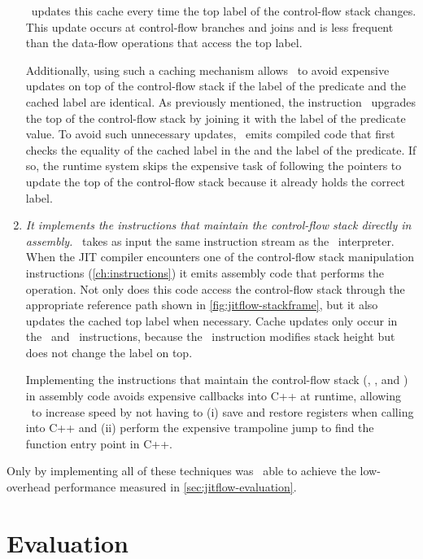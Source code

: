 \begin{enumerate}
\JitFlow\ updates this cache every time the top label of the control-flow stack changes.
This update occurs at control-flow branches and joins and is less frequent than the data-flow operations that access the top label.

Additionally, using such a caching mechanism allows \JitFlow\ to avoid expensive updates on top of the control-flow stack if the label of the predicate and the cached label are identical.
As previously mentioned, the instruction \join\ upgrades the top of the control-flow stack by joining it with the label of the predicate value.
To avoid such unnecessary updates, \JitFlow\ emits compiled code that first checks the equality of the cached label in the  and the label of the predicate.
If so, the runtime system skips the expensive task of following the pointers to update the top of the control-flow stack because it already holds the correct label.

\item \textit{It implements the instructions that maintain the control-flow stack directly in assembly.}
\JitFlow\ takes as input the same instruction stream as the \FlowCore\ interpreter.
When the JIT compiler encounters one of the control-flow stack manipulation instructions (\autoref{ch:instructions}) it emits assembly code that performs the operation.
Not only does this code access the control-flow stack through the appropriate reference path shown in \autoref{fig:jitflow-stackframe}, but it also updates the cached top label when necessary.
Cache updates only occur in the \join\ and \popj\ instructions, because the \dup\ instruction modifies stack height but does not change the label on top.

Implementing the instructions that maintain the control-flow stack (\dup, \join, and \popj) in assembly code avoids expensive callbacks into C++ at runtime, allowing \JitFlow\ to increase speed by not having to (i) save and restore registers when calling into C++ and (ii) perform the expensive trampoline jump to find the function entry point in C++.

\end{enumerate}

Only by implementing all of these techniques was \JitFlow\ able to achieve the low-overhead performance measured in \autoref{sec:jitflow-evaluation}.

\section{Evaluation}
\label{sec:jitflow-evaluation}

